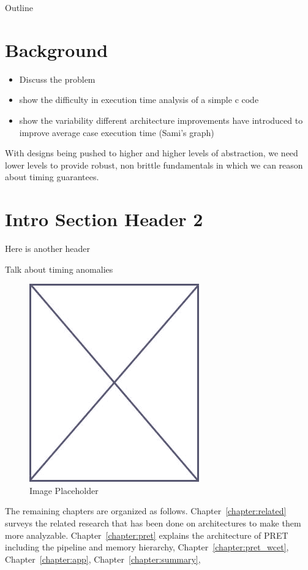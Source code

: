Outline


\section{Background}
\label{sec:background}
\begin{itemize}
  \item Discuss the problem
  \item show the difficulty in execution time analysis of a simple c code
  \item show the variability different architecture improvements have introduced to improve average case execution time (Sami's graph)
\end{itemize}

With designs being pushed to higher and higher levels of abstraction, we need lower levels to provide robust, non brittle fundamentals in which we can reason about timing guarantees.

\section{Intro Section Header 2}
\label{sec:intro_sec_2}

Here is another header



Talk about timing anomalies
\label{bookmark:timing_anomalies}

\begin{figure}
\begin{center}
\vspace{-32pt}
\includegraphics[scale=.45]{figs/placeholder}
\end{center}
\vspace{-12pt}
\caption{Image Placeholder}
\label{fig:placeholder_intro}
\end{figure}

The remaining chapters are organized as follows. 
Chapter~\ref{chapter:related} surveys the related research that has been done on architectures to make them more analyzable.
Chapter~\ref{chapter:pret} explains the architecture of PRET including the \thdint pipeline and memory hierarchy, Chapter~\ref{chapter:pret_wcet}, Chapter~\ref{chapter:app}, Chapter~\ref{chapter:summary},


